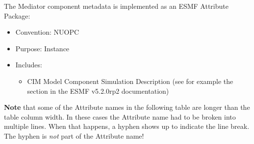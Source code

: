 \label{MediatorCompMeta}
The Mediator component metadata is implemented as an ESMF Attribute Package:

\begin{itemize}
    \item Convention: NUOPC
    \item Purpose: Instance
    \item Includes:
    \begin{itemize}
      \item CIM Model Component Simulation Description (see for example the  section in the ESMF v5.2.0rp2 documentation)
    \end{itemize} 
\end{itemize}

{\bf Note} that some of the Attribute names in the following table are longer than the table column width. In these cases the
Attribute name had to be broken into multiple lines. When that happens, a hyphen shows up to indicate the line break. The hyphen
is {\em not} part of the Attribute name!

